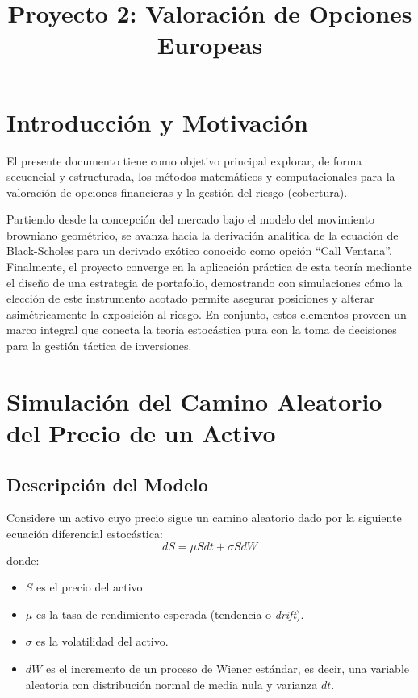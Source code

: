 \documentclass[12pt]{article}
\title{Proyecto 2: Valoración de Opciones Europeas}
\begin{document}
\maketitle

\section{Introducción y Motivación}
El presente documento tiene como objetivo principal explorar, de forma secuencial y estructurada, los métodos matemáticos y computacionales para la valoración de opciones financieras y la gestión del riesgo (cobertura). 

Partiendo desde la concepción del mercado bajo el modelo del movimiento browniano geométrico, se avanza hacia la derivación analítica de la ecuación de Black-Scholes para un derivado exótico conocido como opción ``Call Ventana''. Finalmente, el proyecto converge en la aplicación práctica de esta teoría mediante el diseño de una estrategia de portafolio, demostrando con simulaciones cómo la elección de este instrumento acotado permite asegurar posiciones y alterar asimétricamente la exposición al riesgo. En conjunto, estos elementos proveen un marco integral que conecta la teoría estocástica pura con la toma de decisiones para la gestión táctica de inversiones.

\section{Simulación del Camino Aleatorio del Precio de un Activo}

\subsection{Descripción del Modelo}
Considere un activo cuyo precio sigue un camino aleatorio dado por la siguiente ecuación diferencial estocástica:
\begin{equation}
dS = \mu S dt + \sigma S dW
\end{equation}
donde:
\begin{itemize}
    \item $S$ es el precio del activo.
    \item $\mu$ es la tasa de rendimiento esperada (tendencia o \textit{drift}).
    \item $\sigma$ es la volatilidad del activo.
    \item $dW$ es el incremento de un proceso de Wiener estándar, es decir, una variable aleatoria con distribución normal de media nula y varianza $dt$.
\end{itemize}
\end{document}
